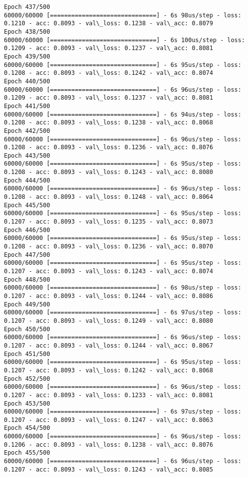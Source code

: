 \documentclass[11pt]{article}
\begin{document}
\begin{Verbatim}[commandchars=\\\{\}]
Epoch 437/500
60000/60000 [==============================] - 6s 98us/step - loss: 0.1210 - acc: 0.8093 - val\_loss: 0.1238 - val\_acc: 0.8079
Epoch 438/500
60000/60000 [==============================] - 6s 100us/step - loss: 0.1209 - acc: 0.8093 - val\_loss: 0.1237 - val\_acc: 0.8081
Epoch 439/500
60000/60000 [==============================] - 6s 95us/step - loss: 0.1208 - acc: 0.8093 - val\_loss: 0.1242 - val\_acc: 0.8074
Epoch 440/500
60000/60000 [==============================] - 6s 96us/step - loss: 0.1209 - acc: 0.8093 - val\_loss: 0.1237 - val\_acc: 0.8081
Epoch 441/500
60000/60000 [==============================] - 6s 94us/step - loss: 0.1208 - acc: 0.8093 - val\_loss: 0.1238 - val\_acc: 0.8068
Epoch 442/500
60000/60000 [==============================] - 6s 96us/step - loss: 0.1208 - acc: 0.8093 - val\_loss: 0.1236 - val\_acc: 0.8076
Epoch 443/500
60000/60000 [==============================] - 6s 95us/step - loss: 0.1208 - acc: 0.8093 - val\_loss: 0.1243 - val\_acc: 0.8080
Epoch 444/500
60000/60000 [==============================] - 6s 96us/step - loss: 0.1208 - acc: 0.8093 - val\_loss: 0.1248 - val\_acc: 0.8064
Epoch 445/500
60000/60000 [==============================] - 6s 95us/step - loss: 0.1207 - acc: 0.8093 - val\_loss: 0.1235 - val\_acc: 0.8073
Epoch 446/500
60000/60000 [==============================] - 6s 95us/step - loss: 0.1208 - acc: 0.8093 - val\_loss: 0.1236 - val\_acc: 0.8070
Epoch 447/500
60000/60000 [==============================] - 6s 95us/step - loss: 0.1207 - acc: 0.8093 - val\_loss: 0.1243 - val\_acc: 0.8074
Epoch 448/500
60000/60000 [==============================] - 6s 98us/step - loss: 0.1207 - acc: 0.8093 - val\_loss: 0.1244 - val\_acc: 0.8086
Epoch 449/500
60000/60000 [==============================] - 6s 97us/step - loss: 0.1207 - acc: 0.8093 - val\_loss: 0.1249 - val\_acc: 0.8080
Epoch 450/500
60000/60000 [==============================] - 6s 96us/step - loss: 0.1207 - acc: 0.8093 - val\_loss: 0.1244 - val\_acc: 0.8067
Epoch 451/500
60000/60000 [==============================] - 6s 95us/step - loss: 0.1207 - acc: 0.8093 - val\_loss: 0.1242 - val\_acc: 0.8068
Epoch 452/500
60000/60000 [==============================] - 6s 96us/step - loss: 0.1207 - acc: 0.8093 - val\_loss: 0.1233 - val\_acc: 0.8081
Epoch 453/500
60000/60000 [==============================] - 6s 97us/step - loss: 0.1207 - acc: 0.8093 - val\_loss: 0.1247 - val\_acc: 0.8063
Epoch 454/500
60000/60000 [==============================] - 6s 96us/step - loss: 0.1206 - acc: 0.8093 - val\_loss: 0.1238 - val\_acc: 0.8076
Epoch 455/500
60000/60000 [==============================] - 6s 96us/step - loss: 0.1207 - acc: 0.8093 - val\_loss: 0.1243 - val\_acc: 0.8085

\end{Verbatim}
\end{document}
